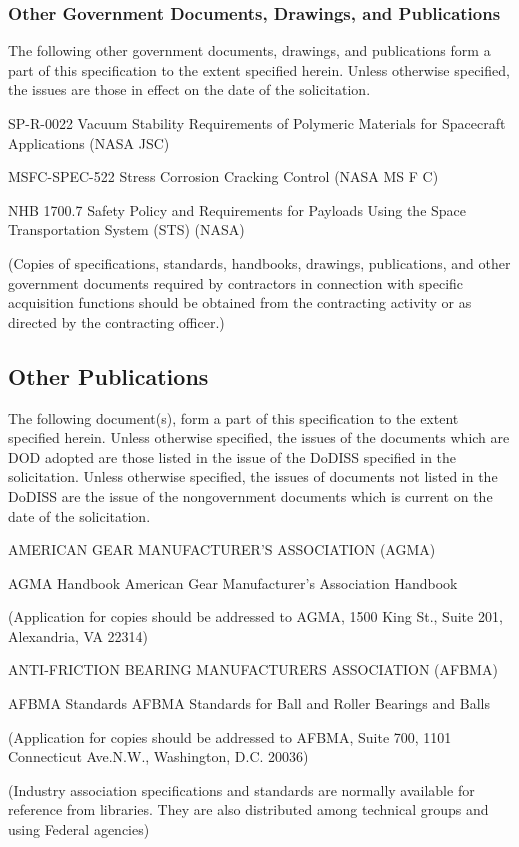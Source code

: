 \documentclass[12pt]{article}
\begin{document}
\subsubsection{Other Government Documents, Drawings, and Publications} %
The following other government documents, drawings, and publications form a part of this specification to the extent specified herein. 
Unless otherwise specified, the issues are those in effect on the date of the solicitation.

SP-R-0022 Vacuum Stability Requirements of Polymeric Materials for Spacecraft Applications (NASA JSC)

MSFC-SPEC-522 Stress Corrosion Cracking Control (NASA MS F C)

NHB 1700.7 Safety Policy and Requirements for Payloads Using the Space Transportation System (STS) (NASA)

(Copies of specifications, standards, handbooks, drawings, publications, and other government documents required by contractors in connection with specific acquisition functions should be obtained from the contracting activity or as directed by the contracting officer.)

\subsection{Other Publications} %
The following document(s), form a part of this specification to the extent specified herein.
Unless otherwise specified, the issues of the documents which are DOD adopted are those listed in the issue of the DoDISS specified in the solicitation. 
Unless otherwise specified, the issues of documents not listed in the DoDISS are the issue of the nongovernment documents which is current on the date of the solicitation.

AMERICAN GEAR MANUFACTURER'S ASSOCIATION (AGMA)

AGMA Handbook American Gear Manufacturer's Association Handbook

(Application for copies should be addressed to AGMA, 1500 King St., Suite 201, Alexandria, VA 22314)

ANTI-FRICTION BEARING MANUFACTURERS ASSOCIATION (AFBMA)

AFBMA Standards AFBMA Standards for Ball and Roller Bearings and Balls

(Application for copies should be addressed to AFBMA, Suite 700, 1101 Connecticut Ave.N.W., Washington, D.C. 20036)

(Industry association specifications and standards are normally available for reference from libraries. 
They are also distributed among technical groups and using Federal agencies)
\end{document}
